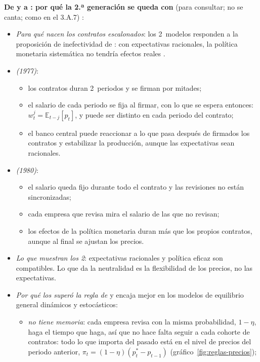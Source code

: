 \documentclass[11pt]{article}
\begin{document}
\begin{anotaciones}
\textbf{De  y  a : por qué la 2.ª generación se queda con } (para consultar; no se canta; como en el 3.A.7) :
\begin{itemize}
\item \emph{Para qué nacen los contratos escalonados}: los 2~modelos responden a la proposición de inefectividad de \textcite{SargentWallace1975Rational}: con expectativas racionales, la política monetaria sistemática no tendría efectos reales .
\item \emph{ (1977)}\nocite{Fischer1977Long}:
  \begin{itemize}
  \item los contratos duran 2~periodos y se firman por mitades;
  \item el salario de cada periodo se fija al firmar, con lo que se espera entonces: $w^j_t=\mathbb{E}_{t-j}[p_t]$, y puede ser distinto en cada periodo del contrato;
  \item el banco central puede reaccionar a lo que pasa después de firmados los contratos y estabilizar la producción, aunque las expectativas sean racionales.
  \end{itemize}
\item \emph{ (1980)}\nocite{Taylor1980Aggregate}:
  \begin{itemize}
  \item el salario queda fijo durante todo el contrato y las revisiones no están sincronizadas;
  \item cada empresa que revisa mira el salario de las que no revisan;
  \item los efectos de la política monetaria duran más que los propios contratos, aunque al final se ajustan los precios.
  \end{itemize}
\item \emph{Lo que muestran los 2}: expectativas racionales y política eficaz son compatibles. Lo que da la neutralidad es la flexibilidad de los precios, no las expectativas.
\item \emph{Por qué los superó la regla de \textcite{Calvo1983Staggered}} y encaja mejor en los modelos de equilibrio general dinámicos y estocásticos:
  \begin{itemize}
  \item \emph{no tiene memoria}: cada empresa revisa con la misma probabilidad, $1-\eta$, haga el tiempo que haga, así que no hace falta seguir a cada cohorte de contratos: todo lo que importa del pasado está en el nivel de precios del periodo anterior, $\pi_t=(1-\eta)(p^*_t-p_{t-1})$ (gráfico~\ref{fig:reglas-precios});

\end{itemize}
\end{itemize}
\end{anotaciones}
\end{document}
